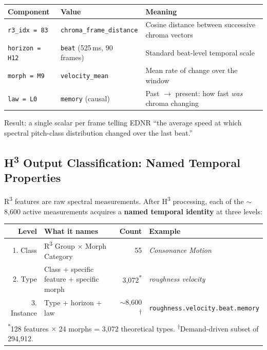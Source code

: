 \begin{center}
\small
\begin{tabular}{@{}lll@{}}
\toprule
\textbf{Component} & \textbf{Value} & \textbf{Meaning} \\
\midrule
\texttt{r3\_idx = 83}  & \texttt{chroma\_frame\_distance} & Cosine distance between successive chroma vectors \\
\texttt{horizon = H12} & \texttt{beat} (525\,ms, 90 frames) & Standard beat-level temporal scale \\
\texttt{morph = M9}    & \texttt{velocity\_mean}           & Mean rate of change over the window \\
\texttt{law = L0}      & \texttt{memory} (causal)           & Past $\to$ present: how fast \emph{was} chroma changing \\
\bottomrule
\end{tabular}
\end{center}

\noindent
Result: a single scalar per frame telling EDNR ``the average speed at which
spectral pitch-class distribution changed over the last beat.''

\bigskip

\subsection{H\textsuperscript{3} Output Classification: Named Temporal Properties}
\label{subsec:h3-output-classes}

R\textsuperscript{3} features are raw spectral measurements.
After H\textsuperscript{3} processing, each of the $\sim$8{,}600 active
measurements acquires a \textbf{named temporal identity} at three levels:

\begin{center}
\renewcommand{\arraystretch}{1.2}
\begin{tabular}{@{}rlrl@{}}
\toprule
\textbf{Level} & \textbf{What it names} & \textbf{Count} & \textbf{Example} \\
\midrule
1. Class  & R\textsuperscript{3} Group $\times$ Morph Category & 55
  & \emph{Consonance Motion} \\
2. Type   & Class + specific feature + specific morph & 3{,}072\textsuperscript{*}
  & \emph{roughness velocity} \\
3. Instance & Type + horizon + law & $\sim$8{,}600\textsuperscript{$\dagger$}
  & \texttt{roughness.velocity.beat.memory} \\
\bottomrule
\multicolumn{4}{l}{\scriptsize \textsuperscript{*}128 features $\times$ 24 morphs = 3{,}072 theoretical types.
\textsuperscript{$\dagger$}Demand-driven subset of 294{,}912.}
\end{tabular}
\end{center}

